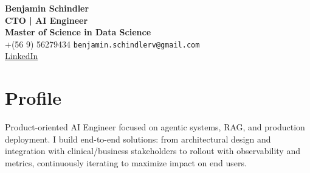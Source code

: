 \documentclass[a4paper,10pt]{article}
\begin{document}
\pagestyle{empty}

\begin{center}
    {\LARGE \textbf{Benjamin Schindler}} \\
    \vspace{0.15cm}
    \textbf{CTO | AI Engineer} \\
    \vspace{0.05cm}
    \textbf{Master of Science in Data Science} \\
    \vspace{0.15cm}
    +(56 9) 56279434 \hspace{0.5cm} \texttt{benjamin.schindlerv@gmail.com} \\
    \vspace{0.05cm}
    \href{https://www.linkedin.com/in/benjamin-schindler-92881a2b2/}{LinkedIn}
\end{center}

\section*{Profile}
Product-oriented AI Engineer focused on agentic systems, RAG, and production deployment. I build end-to-end solutions: from architectural design and integration with clinical/business stakeholders to rollout with observability and metrics, continuously iterating to maximize impact on end users.
\end{document}
